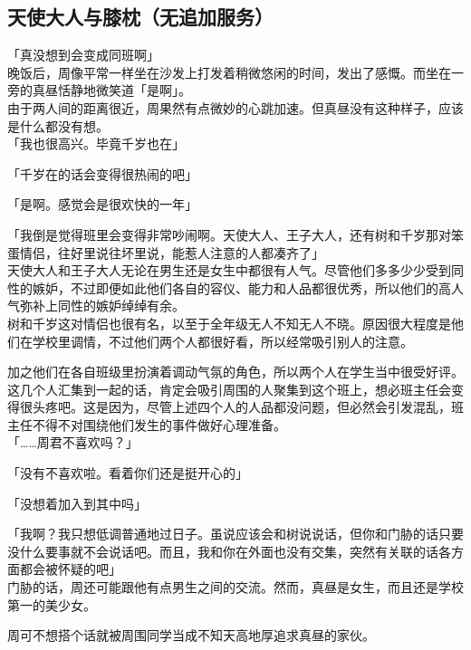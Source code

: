 \subsection{天使大人与膝枕（无追加服务）}

「真没想到会变成同班啊」\\

晚饭后，周像平常一样坐在沙发上打发着稍微悠闲的时间，发出了感慨。而坐在一旁的真昼恬静地微笑道「是啊」。\\

由于两人间的距离很近，周果然有点微妙的心跳加速。但真昼没有这种样子，应该是什么都没有想。\\

「我也很高兴。毕竟千岁也在」

「千岁在的话会变得很热闹的吧」

「是啊。感觉会是很欢快的一年」

「我倒是觉得班里会变得非常吵闹啊。天使大人、王子大人，还有树和千岁那对笨蛋情侣，往好里说往坏里说，能惹人注意的人都凑齐了」\\

天使大人和王子大人无论在男生还是女生中都很有人气。尽管他们多多少少受到同性的嫉妒，不过即便如此他们各自的容仪、能力和人品都很优秀，所以他们的高人气弥补上同性的嫉妒绰绰有余。\\

树和千岁这对情侣也很有名，以至于全年级无人不知无人不晓。原因很大程度是他们在学校里调情，不过他们两个人都很好看，所以经常吸引别人的注意。

加之他们在各自班级里扮演着调动气氛的角色，所以两个人在学生当中很受好评。\\

这几个人汇集到一起的话，肯定会吸引周围的人聚集到这个班上，想必班主任会变得很头疼吧。这是因为，尽管上述四个人的人品都没问题，但必然会引发混乱，班主任不得不对围绕他们发生的事件做好心理准备。\\

「……周君不喜欢吗？」

「没有不喜欢啦。看着你们还是挺开心的」

「没想着加入到其中吗」

「我啊？我只想低调普通地过日子。虽说应该会和树说说话，但你和门胁的话只要没什么要事就不会说话吧。而且，我和你在外面也没有交集，突然有关联的话各方面都会被怀疑的吧」\\

门胁的话，周还可能跟他有点男生之间的交流。然而，真昼是女生，而且还是学校第一的美少女。

周可不想搭个话就被周围同学当成不知天高地厚追求真昼的家伙。\\

